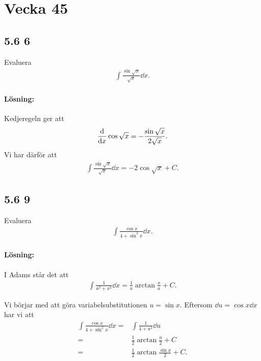 \section{Vecka 45}%
\label{sec:vecka_45}


\subsection{5.6 6}%
\label{sub:5_6_6}

Evaluera
\begin{align*}
	\int \frac{\sin \sqrt{x}}{\sqrt{x}} \dd{x}.
\end{align*}

\paragraph{Lösning:}

Kedjeregeln ger att
\begin{align*}
	\derivative{}{x} \cos \sqrt{x} = -\frac{\sin \sqrt{x}}{2 \sqrt{x}}.
\end{align*}
Vi har därför att
\begin{align*}
	\int \frac{\sin \sqrt{x}}{\sqrt{x}} \dd{x} = -2 \cos{\sqrt{x}} + C.
\end{align*}


\subsection{5.6 9}%
\label{sub:5_6_9}

Evaluera
\begin{align*}
	\int \frac{\cos{x}}{4 + \sin^2{x}} \dd{x}.
\end{align*}

\paragraph{Lösning:}

I Adams står det att
\begin{align*}
	\int \frac{1}{a^2 + x^2} \dd{x} = \frac{1}{a} \arctan \frac{x}{a} + C.
\end{align*}

Vi börjar med att göra variabelsubstitutionen $u = \sin x$.
Eftersom $\dd{u} = \cos{x} \dd{x}$ har vi att
\begin{align*}
	\int \frac{\cos{x}}{4 + \sin^2{x}} \dd{x} ={}& \int \frac{1}{4 + u^2} \dd{u}\\
	={}& \frac{1}{2} \arctan \frac{u}{2} + C\\
	={}& \frac{1}{2} \arctan \frac{\sin x}{2} + C.
\end{align*}


